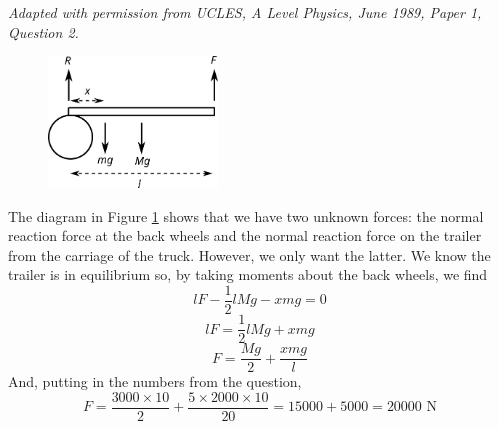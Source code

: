 
\begin{problem}[A1986PIQ2a] %
{}
{\textit{Adapted with permission from UCLES, A Level Physics, June 1989, Paper 1, Question 2.}}
{
\begin{figure} [h]
	\centering
	\includegraphics[width=0.4\textwidth]{../../../figures/Statics_trailer.svg}
	\caption{} \label{fig:Statics_trailer}
\end{figure}
The diagram in Figure \ref{fig:Statics_trailer} shows that we have two unknown forces: the normal reaction force  at the back wheels and the normal reaction force  on the trailer from the carriage of the truck. However, we only want the latter. We know the trailer is in equilibrium so, by taking moments about the back wheels, we find
\begin{equation*}
lF-\frac{1}{2}lMg-xmg=0	
\end{equation*}
\begin{equation*}
lF=\frac{1}{2}lMg+xmg	
\end{equation*}
\begin{equation*}
F=\frac{Mg}{2}+\frac{xmg}{l}	
\end{equation*}
And, putting in the numbers from the question,
\begin{equation*}
F=\frac{3000\times 10}{2}+\frac{5\times 2000\times 10}{20}=15000+5000=20000\textrm{ N}	
\end{equation*}
}
\end{problem}